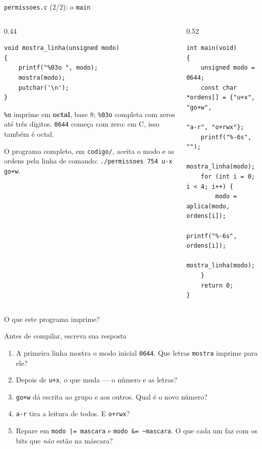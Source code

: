 \documentclass[aspectratio=169]{beamer}
\newcommand{\til}{\textasciitilde}
\begin{document}
\begin{frame}[fragile]{\texttt{permissoes.c} (2/2): o \texttt{main}}
  \vspace{-0.3em}
  \begin{columns}[T]
    \begin{column}{0.44\textwidth}
\begin{lstlisting}[style=codC]
void mostra_linha(unsigned modo)
{
    printf("%03o ", modo);
    mostra(modo);
    putchar('\n');
}
\end{lstlisting}
      \small
      \texttt{\%o} imprime em \textbf{octal}, base 8;
      \texttt{\%03o} completa com zeros até três dígitos.
      \texttt{0644} começa com zero: em C, isso também é octal.

      \medskip
      O programa completo, em \texttt{codigo/}, aceita o modo e as ordens
      pela linha de comando: \texttt{./permissoes 754 u-x go+w}.
    \end{column}
    \begin{column}{0.52\textwidth}
\begin{lstlisting}[style=codC]
int main(void)
{
    unsigned modo = 0644;
    const char *ordens[] = {"u+x", "go+w",
                            "a-r", "o+rwx"};
    printf("%-6s", "");
    mostra_linha(modo);
    for (int i = 0; i < 4; i++) {
        modo = aplica(modo, ordens[i]);
        printf("%-6s", ordens[i]);
        mostra_linha(modo);
    }
    return 0;
}
\end{lstlisting}
    \end{column}
  \end{columns}
\end{frame}

\begin{frame}{O que este programa imprime?}
  \begin{block}{Antes de compilar, escreva sua resposta}
    \begin{enumerate}
      \item A primeira linha mostra o modo inicial \texttt{0644}. Que letras
        \texttt{mostra} imprime para ele?
      \item Depois de \texttt{u+x}, o que muda --- o número e as letras?
      \item \texttt{go+w} dá escrita ao grupo e aos outros. Qual é o novo
        número?
      \item \texttt{a-r} tira a leitura de todos. E \texttt{o+rwx}?
      \item Repare em \texttt{modo |= mascara} e \texttt{modo \&= \til mascara}.
        O que cada um faz com os bits que \emph{não} estão na máscara?
    \end{enumerate}
  \end{block}
\end{frame}
\end{document}

